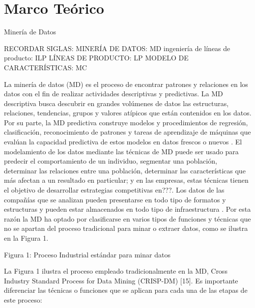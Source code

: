 \chapter{Marco Teórico}

Minería de Datos

RECORDAR SIGLAS: 
MINERÍA DE DATOS: MD
ingeniería de líneas de producto: ILP
LÍNEAS DE PRODUCTO: LP
MODELO DE CARACTERÍSTICAS: MC

La minería de datos (MD) es el proceso de encontrar patrones y relaciones en los datos con el fin de realizar actividades descriptivas y predictivas. La MD descriptiva busca descubrir en grandes volúmenes de datos las estructuras, relaciones, tendencias, grupos y valores atípicos que están contenidos en los datos. Por su parte, la MD predictiva construye modelos y procedimientos de regresión, clasificación, reconocimiento de patrones y tareas de aprendizaje de máquinas  que evalúan la capacidad predictiva de estos modelos en datos frescos o nuevos \cite{Izenman2006}. 
El modelamiento de los datos mediante las técnicas de MD puede ser usado para predecir el comportamiento de un individuo, segmentar una población, determinar las relaciones entre una población, determinar las características que más afectan a un resultado en particular; y en las empresas, estas técnicas tienen el objetivo de desarrollar estrategias competitivas en???. Los datos de las compañías que se analizan pueden presentarse en todo tipo de formatos y estructuras y pueden estar almacenados en todo tipo de infraestructura \cite{Izenman2006}. Por esta razón la MD ha optado por clasificarse en varios tipos de funciones y técnicas que no se apartan del proceso tradicional para minar o extraer datos, como se ilustra en la Figura 1.

Figura 1: Proceso Industrial estándar para minar datos

La Figura 1 ilustra el proceso empleado tradicionalmente en la MD, Cross Industry Standard Process for Data Mining  (CRISP-DM) [15]. Es importante diferenciar las técnicas o funciones que se aplican para cada una de las etapas de este proceso:

